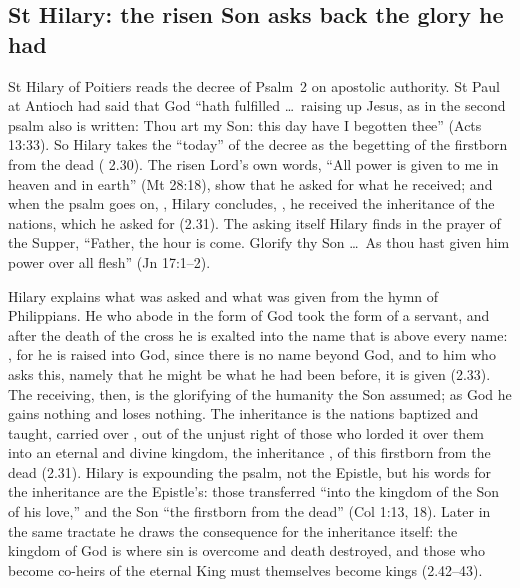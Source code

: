 \subsection{St Hilary: the risen Son asks back the glory he had}
\label{sec:lamb-hilary}

St Hilary of Poitiers reads the decree of Psalm~2 on apostolic authority. St
Paul at Antioch had said that God ``hath fulfilled \dots\ raising up Jesus, as
in the second psalm also is written: Thou art my Son: this day have I begotten
thee'' (Acts 13:33). So Hilary takes the ``today'' of the decree as the
begetting of the firstborn from the dead (
2.30). The risen Lord's own words, ``All power is given to me in heaven and in
earth'' (Mt 28:18), show that he asked for what he received; and when
the psalm goes on, , Hilary concludes, , he received the inheritance of the
nations, which he asked for (2.31). The asking itself Hilary finds in the prayer of the Supper, ``Father, the hour is come. Glorify
thy Son \dots\ As thou hast given him power over all flesh'' (Jn 17:1--2).

Hilary explains what was asked and what was given from the hymn of
Philippians. He who abode in the form of God took the form of a servant, and
after the death of the cross he is exalted into the name that is above every
name: , for he is
raised into God, since there is no name beyond God, and to him who asks this,
namely that he might be what he had been before, it is given (2.33). The
receiving, then, is the glorifying of the humanity the Son assumed; as God he
gains nothing and loses nothing. The inheritance is the nations baptized and
taught, carried over , out of the unjust right of those who lorded it over them
into an eternal and divine kingdom, the inheritance , of this firstborn from the dead (2.31). Hilary is expounding the
psalm, not the Epistle, but his words for the inheritance are the Epistle's:
those transferred ``into the kingdom of the Son of his love,'' and the Son
``the firstborn from the dead'' (Col 1:13, 18). Later in the same tractate he
draws the consequence for the inheritance itself: the kingdom of God is where
sin is overcome and death destroyed, and those who become co-heirs of the
eternal King must themselves become kings (2.42--43).

